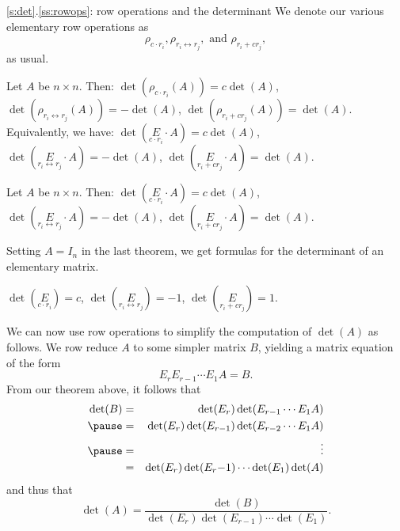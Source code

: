 \begin{frame}{\ref{s:det}.\ref{ss:rowops}: row operations and the determinant}
We denote our various elementary row operations as 
\[
\rho_{c\cdot r_i}, \rho_{r_i\leftrightarrow r_j},\text{ and } \rho_{r_i+cr_j},
\]
as usual.
\pause
\begin{theorem}
Let $A$ be $n\times n$. Then:
\bb[(i)]
\pause\ii $\det(\rho_{c\cdot r_i}(A))=c\det(A)$,
\pause\ii $\det(\rho_{r_i\leftrightarrow r_j}(A))=-\det(A)$,
\pause\ii $\det(\rho_{r_i+cr_j}(A))=\det(A)$. 
\ee
\pause
Equivalently, we have: 
\bb[(i)]
\ii $\det(\underset{c\cdot r_i}{E}\cdot A)=c\det(A)$,
\ii $\det(\underset{r_i\leftrightarrow r_j}{E}\cdot A)=-\det(A)$,
\ii $\det(\underset{r_i+cr_j}{E}\cdot A)=\det(A)$. 
\ee
\end{theorem}
\end{frame}
\begin{frame}
\begin{theorem}\scriptsize
Let $A$ be $n\times n$. Then:
\bb[(i)]
\ii $\det(\underset{c\cdot r_i}{E}\cdot A)=c\det(A)$,
\ii $\det(\underset{r_i\leftrightarrow r_j}{E}\cdot A)=-\det(A)$,
\ii $\det(\underset{r_i+cr_j}{E}\cdot A)=\det(A)$. 
\ee
\end{theorem}
Setting $A=I_n$ in the last theorem, we get formulas for the determinant of an elementary matrix. 
\pause
\begin{corollary}
\bb[(i)]
\ii $\det(\underset{c\cdot r_i}{E})=c$,
\ii $\det(\underset{r_i\leftrightarrow r_j}{E})=-1$,
\ii $\det(\underset{r_i+cr_j}{E})=1$. 
\ee
\end{corollary}
\end{frame}
\begin{frame}
We can now use row operations to simplify the computation of $\det(A)$ as follows. We row reduce $A$ to some simpler matrix $B$, yielding a matrix equation of the form 
\[
E_rE_{r-1}\cdots E_1A=B.
\]
\pause
From our theorem above, it follows that 
\begin{eqnarray*}
\det(B)&=&\det(E_r)\det(E_{r-1}\cdots E_1A)\\
\pause&=&\det(E_r)\det(E_{r-1})\det(E_{r-2}\cdots E_1A)\\
\pause&=&\vdots \\
&=&\det(E_r)\det(E_r{-1})\cdots \det(E_1)\det(A)
\end{eqnarray*}
and thus that 
\[
\det(A)=\frac{\det(B)}{\det(E_r)\det(E_{r-1})\cdots \det(E_1)}.
\]
\end{frame}
